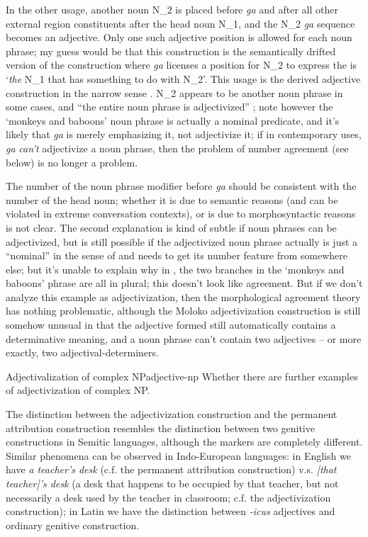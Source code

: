 \documentclass[a4paper, oneside, 12pt]{report}
\newcommand*{\citepage}[1]{p.~{#1}}
\newcommand*{\citepages}[1]{pp.~{#1}}
\newcommand{\form}[1]{\emph{#1}}
\newcommand{\translate}[1]{`#1'}
\begin{document}
In the other usage, 
another noun N_2 is placed before \form{ga} 
and after all other external region constituents
after the head noun N_1, 
and the N_2 \form{ga} sequence becomes an adjective. 
Only one such adjective position is allowed for each noun phrase; 
my guess would be that this construction is the semantically drifted version of 
the construction where \form{ga} 
licenses a position for N_2 to express
the is \translate{\emph{the} N_1 that has something to do with N_2}.
This usage is the derived adjective construction in the narrow sense 
\citep[\citepages{149-152}]{friesen2017grammar}.
N_2 appears to be another noun phrase in some cases, 
and ``the entire noun phrase is adjectivized''
\citep[\citepage{151, (45)}]{friesen2017grammar}; 
note however the \translate{monkeys and baboons} 
noun phrase is actually a nominal predicate, 
and it's likely that \form{ga} is merely emphasizing it, 
not adjectivize it; 
if in contemporary uses, \form{ga} \emph{can't} adjectivize 
a noun phrase, then the problem of number agreement (see below) 
is no longer a problem.

The number of the noun phrase modifier before \form{ga} 
should be consistent with the number of the head noun; 
whether it is due to semantic reasons  
(and can be violated in extreme conversation contexts),
or is due to morphosyntactic reasons is not clear.
The second explanation is 
kind of subtle if noun phrases can be adjectivized, 
but is still possible if the adjectivized noun phrase 
actually is just a ``nominal'' in the sense of \citet{cgel}
and needs to get its number feature from somewhere else; 
but it's unable to explain why in \citet[\citepage{151, (45)}]{friesen2017grammar},
the two branches in the \translate{monkeys and baboons} phrase are all in plural; 
this doesn't look like agreement.
But if we don't analyze this example as adjectivization, 
then the morphological agreement theory has nothing problematic, 
although the Moloko adjectivization construction is still somehow unusual 
in that the adjective formed still automatically contains a determinative meaning, 
and a noun phrase can't contain two adjectives -- 
or more exactly, two adjectival-determiners.

\begin{todobox}{Adjectivalization of complex NP}{adjective-np}
    Whether there are further examples of adjectivization of complex NP.
\end{todobox}

The distinction between the adjectivization construction 
and the permanent attribution construction 
resembles the distinction between two genitive constructions in Semitic languages,
although the markers are completely different. 
Similar phenomena can be observed in Indo-European languages:
in English we have \form{a teacher's desk} (c.f. the permanent attribution construction)
v.s. \form{[that teacher]'s desk} 
(a desk that happens to be occupied by that teacher, 
but not necessarily a desk used by the teacher in classroom; 
c.f. the adjectivization construction); 
in Latin we have the distinction between \form{-icus} adjectives and 
ordinary genitive construction.
\end{document}
